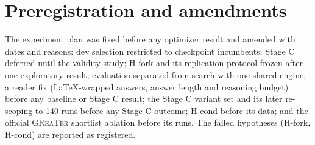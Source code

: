 \documentclass{article}
\newcommand{\greater}{\textsc{GReaTer}}
\begin{document}
\section{Preregistration and amendments}
\label{app:prereg}
The experiment plan was fixed before any optimizer result and amended with dates and
reasons: dev selection restricted to checkpoint incumbents; Stage C deferred until the
validity study; H-fork and its replication protocol frozen after one exploratory result;
evaluation separated from search with one shared engine; a reader fix (\LaTeX{}-wrapped
answers, answer length and reasoning budget) before any baseline or Stage C result; the
Stage C variant set and its later re-scoping to 140 runs before any Stage C outcome;
H-cond before its data; and the official \greater{} shortlist ablation before its runs.
The failed hypotheses (H-fork, H-cond) are reported as registered.
\end{document}
